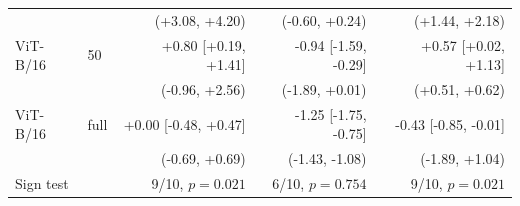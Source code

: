 \begin{table}[H]
\begin{tabular}{llrrr}
 & & (+3.08, +4.20) & (-0.60, +0.24) & (+1.44, +2.18) \\
ViT-B/16 & 50 & +0.80 [+0.19, +1.41] & -0.94 [-1.59, -0.29] & +0.57 [+0.02, +1.13] \\
 & & (-0.96, +2.56) & (-1.89, +0.01) & (+0.51, +0.62) \\
ViT-B/16 & full & +0.00 [-0.48, +0.47] & -1.25 [-1.75, -0.75] & -0.43 [-0.85, -0.01] \\
 & & (-0.69, +0.69) & (-1.43, -1.08) & (-1.89, +1.04) \\
\midrule
\multicolumn{2}{l}{Sign test} & 9/10, $p=0.021$ & 6/10, $p=0.754$ & 9/10, $p=0.021$ \\
\bottomrule
\end{tabular}
\end{table}
